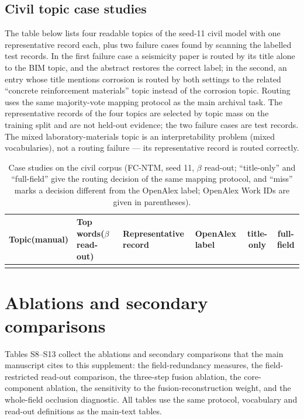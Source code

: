 \documentclass[11pt]{article}
\newcommand{\fcntm}{FC-NTM}
\begin{document}
\subsection{Civil topic case studies}

The table below lists four readable topics of the seed-11 civil model with one representative
record each, plus two failure cases found by scanning the labelled test records. In the first
failure case a seismicity paper is routed by its title alone to the BIM topic, and the abstract
restores the correct label; in the second, an entry whose title mentions corrosion is routed by
both settings to the related ``concrete reinforcement materials'' topic instead of the corrosion
topic. Routing uses the same majority-vote mapping protocol as the main archival task. The
representative records of the four topics are selected by topic mass on the training split and
are not held-out evidence; the two failure cases are test records. The mixed laboratory-materials
topic is an interpretability problem (mixed vocabularies), not a routing failure --- its
representative record is routed correctly.

\begin{table}[t]
\centering
\caption{Case studies on the civil corpus (\fcntm{}, seed 11, $\beta$ read-out; ``title-only'' and ``full-field'' give the routing decision of the same mapping protocol, and ``miss'' marks a decision different from the OpenAlex label; OpenAlex Work IDs are given in parentheses).}
\label{tab:civil-cases}
\scriptsize
\setlength{\tabcolsep}{3pt}
\begin{tabular}{@{}p{2.6cm}p{4.0cm}p{3.6cm}p{2.4cm}cc@{}}
\toprule
Topic(manual) & Top words($\beta$ read-out) & Representative record & OpenAlex label & title-only & full-field \\
\midrule

\\   %
\bottomrule
\end{tabular}
\end{table}

\section{Ablations and secondary comparisons}

Tables S8--S13 collect the ablations and secondary comparisons that the main manuscript cites to
this supplement: the field-redundancy measures, the field-restricted read-out comparison, the
three-step fusion ablation, the core-component ablation, the sensitivity to the
fusion-reconstruction weight, and the whole-field occlusion diagnostic. All tables use the same
protocol, vocabulary and read-out definitions as the main-text tables.
\end{document}

